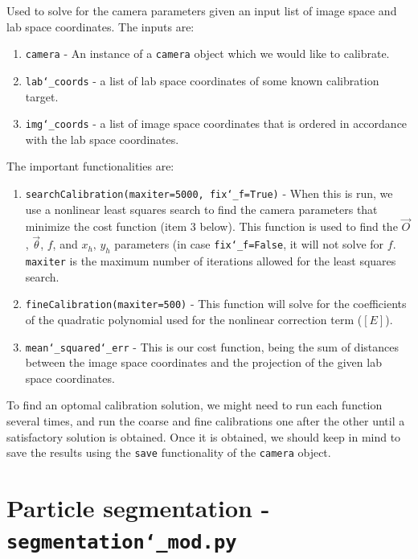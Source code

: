 \documentclass[10pt,a4paper]{article}
\begin{document}
Used to solve for the camera parameters given an input list of image space and lab space coordinates. The inputs are:

\begin{enumerate}
	\item \texttt{camera} - An instance of a \texttt{camera} object which we would like to calibrate.
	\item \texttt{lab\char`_coords} - a list of lab space coordinates of some known calibration target. 
	\item \texttt{img\char`_coords} - a list of image space coordinates that is ordered in accordance with the lab space coordinates. 
\end{enumerate}



The important functionalities are:
%
\begin{enumerate}
	
	\item \texttt{searchCalibration(maxiter=5000, fix\char`_f=True)} - When this is run, we use a nonlinear least squares search to find the camera parameters that minimize the cost function (item 3 below). This function is used to find the $\vec{O}$, $\vec{\theta}$, $f$, and $x_h, \, y_h$ parameters (in case \texttt{fix\char`_f=False}, it will not solve for $f$. \texttt{maxiter} is the maximum number of iterations allowed for the least squares search.
	
	\item \texttt{fineCalibration(maxiter=500)} - This function will solve for the coefficients of the quadratic polynomial used for the nonlinear correction term ($[E]$). 
	
	\item \texttt{mean\char`_squared\char`_err} - This is our cost function, being the sum of distances between the image space coordinates and the projection of the given lab space coordinates.
	
\end{enumerate}
%
To find an optomal calibration solution, we might need to run each function several times, and run the coarse and fine calibrations one after the other until a satisfactory solution is obtained. Once it is obtained, we should keep in mind to save the results using the \texttt{save} functionality of the \texttt{camera} object. 








\section{Particle segmentation - \texttt{segmentation\char`_mod.py}} 
\end{document}
